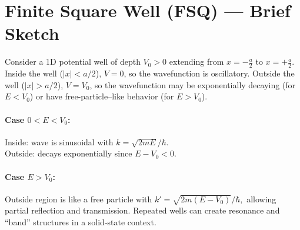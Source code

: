 \section*{Finite Square Well (FSQ) --- Brief Sketch}

Consider a 1D potential well of depth $V_0>0$ extending from $x=-\tfrac{a}{2}$ to $x=+\tfrac{a}{2}$.  Inside the well ($|x|<a/2$), $V=0$, so the wavefunction is oscillatory.  Outside the well ($|x|>a/2$), $V=V_0$, so the wavefunction may be exponentially decaying (for $E<V_0$) or have free‐particle–like behavior (for $E>V_0$).

\paragraph{Case $0 < E < V_0$:} 
Inside:  wave is sinusoidal with $k = \sqrt{2mE}/\hbar$.\\
Outside: decays exponentially since $E - V_0 < 0$.

\paragraph{Case $E > V_0$:} 
Outside region is like a free particle with $k' = \sqrt{2m(E - V_0)}/\hbar,$ allowing partial reflection and transmission. Repeated wells can create resonance and “band” structures in a solid‐state context.
